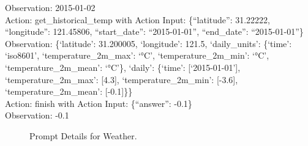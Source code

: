 \begin{tcolorbox}[breakable,title=Prompt Details for Weather]
Observation: 2015-01-02\\
Action: get\_historical\_temp with Action Input: \{``latitude'': 31.22222, ``longitude'': 121.45806, ``start\_date'': ``2015-01-01'', ``end\_date'': ``2015-01-01''\}\\
Observation: \{`latitude': 31.200005, `longitude': 121.5, `daily\_units': \{`time': `iso8601', `temperature\_2m\_max': `°C', `temperature\_2m\_min': `°C', `temperature\_2m\_mean': `°C'\}, `daily': \{`time': [`2015-01-01'], `temperature\_2m\_max': [4.3], `temperature\_2m\_min': [-3.6], `temperature\_2m\_mean': [-0.1]\}\}\\
Action: finish with Action Input: \{``answer'': -0.1\}\\
Observation: -0.1\\
\end{tcolorbox}
\begin{figure}[!h]
    \vspace{-0.08cm}
    \caption{Prompt Details for Weather.}
    \label{fig:weather_prompt}
\end{figure}
